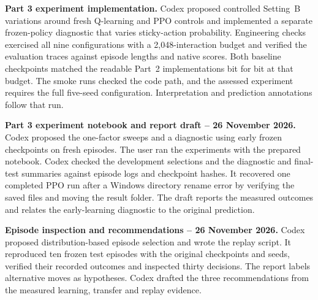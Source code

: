\medskip
\noindent\textbf{Part 3 experiment implementation.}
Codex proposed controlled Setting~B variations around fresh Q-learning and
PPO controls and implemented a separate frozen-policy diagnostic that varies
sticky-action probability. Engineering checks exercised all nine configurations
with a 2,048-interaction budget and verified the evaluation traces against
episode lengths and native scores. Both baseline checkpoints matched the
readable Part~2 implementations bit for bit at that budget. The smoke runs
checked the code path, and the assessed experiment requires the full five-seed
configuration. Interpretation and prediction annotations follow that run.

\medskip
\noindent\textbf{Part 3 experiment notebook and report draft -- 26 November 2026.}
Codex proposed the one-factor sweeps and a diagnostic using early frozen
checkpoints on fresh episodes. The user ran the experiments with the
prepared notebook. Codex checked the development selections and the
diagnostic and final-test summaries against episode logs and checkpoint
hashes. It recovered one completed PPO run after a Windows directory
rename error by verifying the saved files and moving the result folder.
The draft reports the measured outcomes and relates the early-learning
diagnostic to the original prediction.

\medskip
\noindent\textbf{Episode inspection and recommendations -- 26 November 2026.}
Codex proposed distribution-based episode selection and wrote the replay
script. It reproduced ten frozen test episodes with the original checkpoints
and seeds, verified their recorded outcomes and inspected thirty decisions.
The report labels alternative moves as hypotheses. Codex drafted the three
recommendations from the measured learning, transfer and replay evidence.

